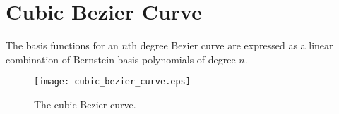 

\chapter{Cubic Bezier Curve}


The basis functions for an $n$th degree Bezier curve are expressed as a linear combination of Bernstein basis
polynomials of degree $n$.

\begin{figure}[h!]
    \centering
    \texttt{[image: cubic\_bezier\_curve.eps]}
    \caption{The cubic Bezier curve.}
    \label{f:cubic_bezier_curve}
\end{figure}

